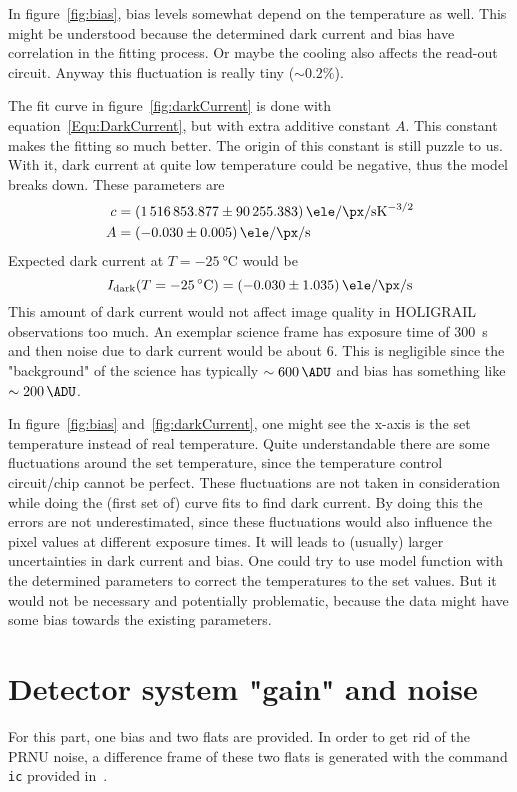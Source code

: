 In figure~\ref{fig:bias}, bias levels somewhat depend on the temperature as well. This might be understood because the determined dark current and bias have correlation in the fitting process. Or maybe the cooling also affects the read-out circuit. Anyway this fluctuation is really tiny ($\sim 0.2\%$).

The fit curve in figure~\ref{fig:darkCurrent} is done with equation~\ref{Equ:DarkCurrent}, but with extra additive constant $A$. This constant makes the fitting so much better. The origin of this constant is still puzzle to us. With it, dark current at quite low temperature could be negative, thus the model breaks down. These parameters are
\begin{align*}
	c &= \SI{1516853.877 +- 90255.383}{\ele\per\px\per\s\kelvin\tothe{-3/2}} \\
	A &= \SI{-0.030 +- 0.005}{\ele\per\px\per\s}
\end{align*}
Expected dark current at $T=\SI{-25}{\degreeCelsius}$ would be
\begin{equation*}
	I_\text{dark} (T = \SI{-25}{\degreeCelsius}) = \SI{-0.030 +- 1.035}{\ele\per\px\per\s}
\end{equation*}
This amount of dark current would not affect image quality in HOLIGRAIL observations too much. An exemplar science frame has exposure time of \SI{300}{\s} and then noise due to dark current would be about \SI{6}{\ADU}. This is negligible since the "background" of the science has typically $\sim \SI{600}{\ADU}$ and bias has something like $\sim \SI{200}{\ADU}$.

In figure~\ref{fig:bias} and~\ref{fig:darkCurrent}, one might see the x-axis is the set temperature instead of real temperature. Quite understandable there are some fluctuations around the set temperature, since the temperature control circuit/chip cannot be perfect. These fluctuations are not taken in consideration while doing the (first set of) curve fits to find dark current. By doing this the errors are not underestimated, since these fluctuations would also influence the pixel values at different exposure times. It will leads to (usually) larger uncertainties in dark current and bias. One could try to use model function with the determined parameters to correct the temperatures to the set values. But it would not be necessary and potentially problematic, because the data might have some bias towards the existing parameters.

\section{Detector system "gain" and noise}\label{sec:gain}
For this part, one bias and two flats are provided. In order to get rid of the PRNU noise, a difference frame of these two flats is generated with the command \verb|ic| provided in~\cite{manual}.


